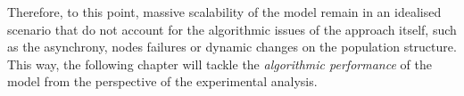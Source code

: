 Therefore, to this point, massive scalability of the \evag model remain in an idealised scenario that do not account for the algorithmic issues of the approach itself, such as the asynchrony, nodes failures or dynamic changes on the population structure. This way, the following chapter will tackle the {\em algorithmic performance} of the model from the perspective of the experimental analysis.






